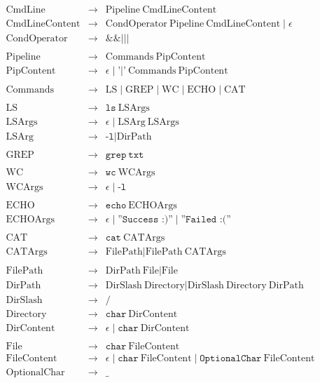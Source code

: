 \documentclass[10pt, a4paper]{article}
\begin{document}
\begin{abcliste}
\begin{eqnarray*}
\text{CmdLine} &\rightarrow& \text{Pipeline} \ \text{CmdLineContent} \\
\text{CmdLineContent} &\rightarrow& \text{CondOperator} \ \text{Pipeline} \ \text{CmdLineContent} \mid \epsilon \\
\text{CondOperator} &\rightarrow& \texttt{\&\&} \mid \texttt{||} \\
\\
\text{Pipeline} &\rightarrow& \text{Commands} \ \text{PipContent} \\
\text{PipContent} &\rightarrow& \epsilon \mid \text{'|'} \ \text{Commands} \ \text{PipContent} \\
\\
\text{Commands} &\rightarrow& \text{LS} \mid \text{GREP} \mid \text{WC} \mid \text{ECHO} \mid \text{CAT} \\
\\
\text{LS} &\rightarrow&  \texttt{ls} \ \text{LSArgs} \\
\text{LSArgs} &\rightarrow& \epsilon \mid \text{LSArg} \ \text{LSArgs} \\
\text{LSArg} &\rightarrow& \texttt{-l} \mid \text{DirPath} \\
\\
\text{GREP} &\rightarrow& \texttt{grep} \ \texttt{txt} \\
\\
\text{WC} &\rightarrow& \texttt{wc} \ \text{WCArgs} \\
\text{WCArgs} &\rightarrow& \epsilon \mid \texttt{-l} \\
\\
\text{ECHO} &\rightarrow& \texttt{echo} \ \text{ECHOArgs} \\
\text{ECHOArgs} &\rightarrow & \epsilon \mid \texttt{''Success :)''} \mid \texttt{''Failed :(''} \\
\\
\text{CAT} &\rightarrow& \texttt{cat} \ \text{CATArgs} \\
\text{CATArgs} &\rightarrow& \text{FilePath} \mid \text{FilePath} \ \text{CATArgs} \\
\\
\text{FilePath} &\rightarrow& \text{DirPath} \ \text{File} \mid \text{File} \\
\text{DirPath} &\rightarrow& \text{DirSlash} \ \text{Directory} \mid \text{DirSlash} \ \text{Directory} \ \text{DirPath} \\
\text{DirSlash} &\rightarrow& \texttt{/} \\
\text{Directory} &\rightarrow& \texttt{char} \ \text{DirContent} \\
\text{DirContent} &\rightarrow& \epsilon \mid \texttt{char} \ \text{DirContent} \\
\\
\text{File} &\rightarrow& \texttt{char} \ \text{FileContent} \\
\text{FileContent} &\rightarrow& \epsilon \mid \texttt{char} \ \text{FileContent} \mid \texttt{OptionalChar} \ \text{FileContent}\\
\text{OptionalChar} &\rightarrow& \texttt{\_}
\end{eqnarray*}



\end{abcliste}
\end{document}
